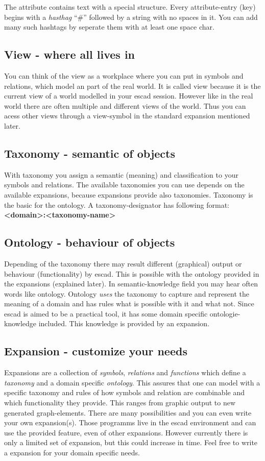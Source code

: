\documentclass[a4paper, 12pt, openany]{scrbook}
\begin{document}
The attribute contains text with a special structure. Every attribute-entry (key) begins with a \emph{hasthag} ``\#'' followed by a string with no spaces in it. You can add many such hashtags by seperate them with at least one space char.
\subsection{View - where all lives in}
You can think of the view as a workplace where you can put in symbols and relations, which model an part of the real world. It is called view because it is the current view of a world modelled in your escad session. However like in the real world there are often multiple and different views of the world. Thus you can acess other views through a view-symbol in the standard expansion mentioned later.
\subsection{Taxonomy - semantic of objects}
With taxonomy you assign a semantic (meaning) and classification to your symbols and relations. The available taxonomies you can use depends on the available expansions, because expansions provide also taxonomies. Taxonomy is the basic for the ontology. A taxonomy-designator has following format: \textbf{<domain>:<taxonomy-name>}
\subsection{Ontology - behaviour of objects}
 Depending of the taxonomy there may result different (graphical) output or behaviour (functionality) by escad. This is possible with the ontology provided in the expansions (explained later). In semantic-knowledge field you may hear often words like ontology. Ontology \emph{uses} the taxonomy to capture and represent the meaning of a domain and has rules what is possible with it and what not. Since escad is aimed to be a practical tool, it has some domain specific ontologie-knowledge included. This knowledge is provided by an expansion.
\subsection{Expansion - customize your needs}
Expansions are a collection of \emph{symbols}, \emph{relations} and \emph{functions} which define a \emph{taxonomy} and a domain specific \emph{ontology}. This assures that one can model with a specific taxonomy and rules of how symbols and relation are combinable and which functionality they provide. This ranges from graphic output to new generated graph-elements. There are many possibilities and you can even write your own expansion(s). Those programms live in the escad environment and can use the provided feature, even of other expansions. However currently there is only a limited set of expansion, but this could increase in time. Feel free to write a expansion for your domain specific needs.
\end{document}
